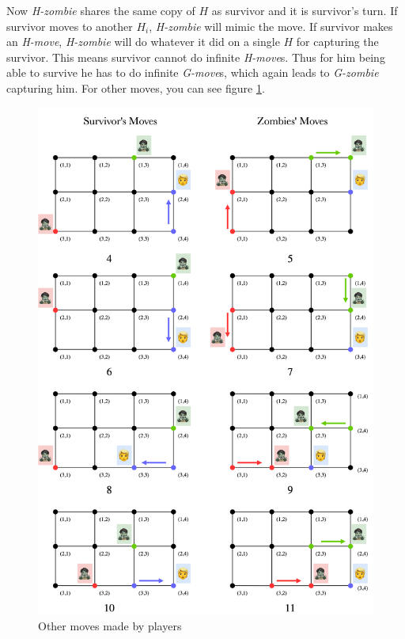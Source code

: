\documentclass[1p]{elsarticle}
\begin{document}
Now {\it H-zombie} shares the same copy of $H$ as survivor and it is survivor's turn. If survivor moves to another
$H_i$, {\it H-zombie} will mimic the move. If survivor makes an {\it H-move}, {\it H-zombie} will do whatever it did on
a single $H$ for capturing the survivor. This means survivor cannot do infinite {\it H-move}s. Thus for him being able
to survive he has to do infinite {\it G-move}s, which again leads to {\it G-zombie} capturing him. For other moves, you
can see figure \ref{fig:p6}.

\begin{figure}[h!]
	\centering
	\includegraphics[width=1\linewidth]{p34m6.png}
	\caption{Other moves made by players}
	\label{fig:p6}
\end{figure}

	
\end{document}
